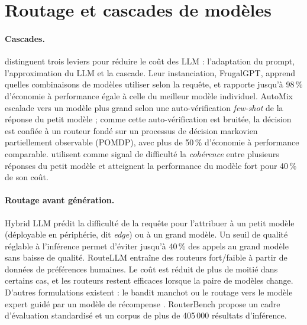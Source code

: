 \documentclass[11pt,a4paper]{article}
\begin{document}
\section{Routage et cascades de modèles}\label{sec:routage}

\paragraph{Cascades.} \citet{chen2023frugalgpt} distinguent trois leviers pour réduire le coût des LLM :
l'adaptation du prompt, l'approximation du LLM et la cascade. Leur instanciation, FrugalGPT, apprend
quelles combinaisons de modèles utiliser selon la requête, et rapporte jusqu'à 98\,\% d'économie à
performance égale à celle du meilleur modèle individuel. AutoMix \citep{aggarwal2023automix} escalade
vers un modèle plus grand selon une auto-vérification \textit{few-shot} de la réponse du petit modèle ;
comme cette auto-vérification est bruitée, la décision est confiée à un routeur fondé sur un processus
de décision markovien partiellement observable (POMDP), avec plus de 50\,\% d'économie à performance
comparable. \citet{yue2023cascades} utilisent comme signal de difficulté la \emph{cohérence} entre
plusieurs réponses du petit modèle et atteignent la performance du modèle fort pour 40\,\% de son coût.

\paragraph{Routage avant génération.} Hybrid LLM \citep{ding2024hybrid} prédit la difficulté de la
requête pour l'attribuer à un petit modèle (déployable en périphérie, dit \textit{edge}) ou à un grand
modèle. Un seuil de qualité réglable à l'inférence permet d'éviter jusqu'à 40\,\% des appels au grand
modèle sans baisse de qualité. RouteLLM \citep{ong2024routellm} entraîne des routeurs fort/faible à
partir de données de préférences humaines. Le coût est réduit de plus de moitié dans certains cas, et
les routeurs restent efficaces lorsque la paire de modèles change. D'autres formulations existent : le
bandit manchot \citep{nguyen2024metallm} ou le routage vers le modèle expert guidé par un modèle de
récompense \citep{lu2023zooter}. RouterBench \citep{hu2024routerbench} propose un cadre d'évaluation
standardisé et un corpus de plus de 405\,000 résultats d'inférence.
\end{document}
